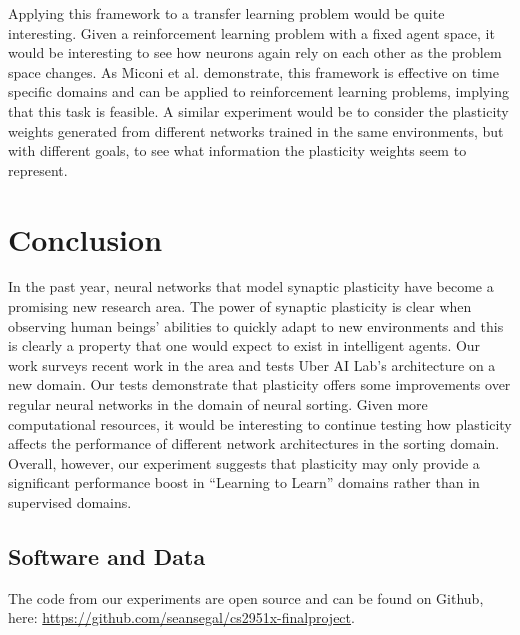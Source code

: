 \documentclass{article}
\begin{document}
Applying this framework to a transfer learning problem would be quite interesting.
Given a reinforcement learning problem with a fixed agent space, it would
be interesting to see how neurons again rely on each other as the problem
space changes. As Miconi et al. demonstrate, this framework is effective on
time specific domains and can be applied to reinforcement learning problems,
implying that this task is feasible. A similar experiment would be to consider
the plasticity weights generated from different networks trained in the same
environments, but with different goals, to see what information the plasticity
weights seem to represent.

\section{Conclusion}
In the past year, neural networks that model synaptic plasticity have become a promising new research area.  The power of synaptic plasticity is clear when observing human beings' abilities to quickly adapt to new environments and this is clearly a property that one would expect to exist in intelligent agents. Our work surveys recent work in the area and tests Uber AI Lab's architecture on a new domain. Our tests demonstrate that plasticity offers some improvements over regular neural networks in the domain of neural sorting. Given more computational resources, it would be interesting to continue testing how plasticity affects the performance of different network architectures in the sorting domain. Overall, however, our experiment suggests that plasticity may only provide a significant performance boost in ``Learning to Learn'' domains rather than in supervised domains.

\subsection{Software and Data}
The code from our experiments are open source and can be found on Github, here: \href{https://github.com/seansegal/cs2951x-finalproject}{https://github.com/seansegal/cs2951x-finalproject}.



\end{document}
